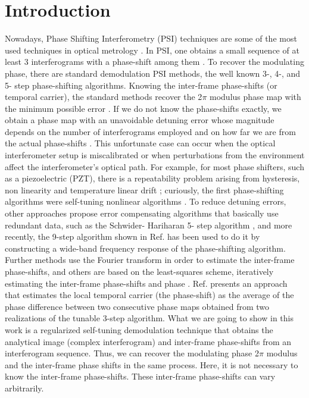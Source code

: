 \documentclass[letterpaper,12pt]{article}   %
\begin{document}
\section{Introduction}
Nowadays, Phase Shifting Interferometry (PSI) techniques are some of
the most used techniques in optical metrology
\cite{a1_OpticalTesting}. In PSI, one obtains a small sequence of at
least 3 interferograms with a phase-shift among them
\cite{a1_OpticalTesting}. To recover the modulating phase, there are
standard demodulation PSI methods, the well known 3-, 4-, and 5- step
phase-shifting algorithms.  Knowing the inter-frame phase-shifts (or
temporal carrier), the standard methods recover the 2$\pi$ modulus
phase map with the minimum possible error
\cite{a1_OpticalTesting,a2_F_K,a3}. If we do not know the phase-shifts
exactly, we obtain a phase map with an unavoidable detuning error
whose magnitude depends on the number of interferograms employed and
on how far we are from the actual phase-shifts
\cite{a3,a4,a5,a6}. This unfortunate case can occur when the optical
interferometer setup is miscalibrated or when perturbations from the
environment affect the interferometer's optical path. For example, for
most phase shifters, such as a piezoelectric (PZT), there is a
repeatability problem arising from hysteresis, non linearity and
temperature linear drift \cite{a5,a7}; curiously, the first
phase-shifting algorithms were self-tuning nonlinear algorithms
\cite{a8,a9}. To reduce detuning errors, other approaches propose
error compensating algorithms that basically use redundant data, such
as the Schwider- Hariharan 5- step algorithm \cite{a4,a10,a11}, and
more recently, the 9-step algorithm shown in Ref. \cite{a12} has been
used to do it by constructing a wide-band frequency response of the
phase-shifting algorithm. Further methods use the Fourier transform in
order to estimate the inter-frame phase-shifts, and others are based
on the least-squares scheme, iteratively estimating the inter-frame
phase-shifts and phase \cite{a13,a14}.  Ref. \cite{a16} presents an
approach that estimates the local temporal carrier (the phase-shift)
as the average of the phase difference between two consecutive phase
maps obtained from two realizations of the tunable 3-step
algorithm. What we are going to show in this work is a regularized
self-tuning demodulation technique that obtains the analytical image
(complex interferogram) and inter-frame phase-shifts from an
interferogram sequence. Thus, we can recover the modulating phase
2$\pi$ modulus and the inter-frame phase shifts in the same
process. Here, it is not necessary to know the inter-frame
phase-shifts. These inter-frame phase-shifts can vary arbitrarily.
\end{document}
